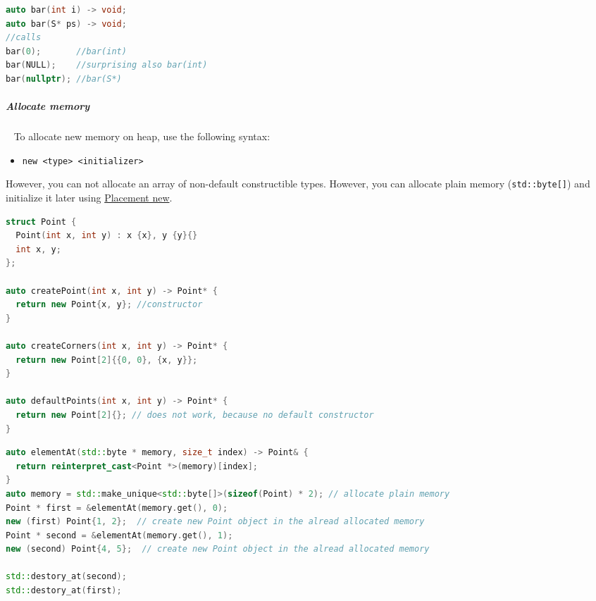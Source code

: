 \documentclass[11pt,twoside,landscape]{article}
\begin{document}
\begin{multicols}{2}
\begin{lstlisting}[language=c++,numbers=none]
auto bar(int i) -> void;
auto bar(S* ps) -> void;
//calls
bar(0);       //bar(int)
bar(NULL);    //surprising also bar(int)
bar(nullptr); //bar(S*)
\end{lstlisting}

\subparagraph{Allocate memory} \
\label{sec:org846e5f6}
To allocate new memory on heap, use the following syntax:
\begin{itemize}
\item \texttt{new <type> <initializer>}
\end{itemize}


However, you can not allocate an array of non-default constructible types.
However, you can allocate plain memory (\texttt{std::byte[]}) and initialize it later using \href{../../../roam/20230622180239-what_is_placement_new_in_cpp.org}{Placement new}.

\begin{lstlisting}[language=c++,label=lst:allocate-new-memory-on-heap,caption={Allocate new memory on heap},captionpos=b,numbers=none]
struct Point {
  Point(int x, int y) : x {x}, y {y}{}
  int x, y;
};

auto createPoint(int x, int y) -> Point* {
  return new Point{x, y}; //constructor
}

auto createCorners(int x, int y) -> Point* {
  return new Point[2]{{0, 0}, {x, y}};
}

auto defaultPoints(int x, int y) -> Point* {
  return new Point[2]{}; // does not work, because no default constructor
}
\end{lstlisting}

\begin{lstlisting}[language=c++,label=lst:example-for-a-non-default-constructible-type-on-the-heap,caption={Example for a non default constructible type on the heap},captionpos=b,numbers=none]
auto elementAt(std::byte * memory, size_t index) -> Point& {
  return reinterpret_cast<Point *>(memory)[index];
}
auto memory = std::make_unique<std::byte[]>(sizeof(Point) * 2); // allocate plain memory
Point * first = &elementAt(memory.get(), 0);
new (first) Point{1, 2};  // create new Point object in the alread allocated memory
Point * second = &elementAt(memory.get(), 1);
new (second) Point{4, 5};  // create new Point object in the alread allocated memory

std::destory_at(second);
std::destory_at(first);
\end{lstlisting}


\end{multicols}
\end{document}
